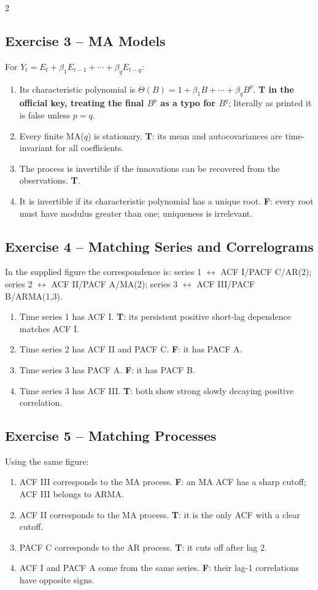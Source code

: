 \documentclass[9pt,a4paper]{extarticle}
\begin{document}
\begin{multicols}{2}
\subsection*{Exercise 3 -- MA Models}
For \(Y_t=E_t+\beta_1E_{t-1}+\cdots+\beta_qE_{t-q}\):
\begin{enumerate}[label=\alph*),leftmargin=4mm]
\item Its characteristic polynomial is \(\Theta(B)=1+\beta_1B+\cdots+\beta_qB^p\). \textbf{T in the official key, treating the final \(B^p\) as a typo for \(B^q\)}; literally as printed it is false unless \(p=q\).
\item Every finite MA(\(q\)) is stationary. \textbf{T}: its mean and autocovariances are time-invariant for all coefficients.
\item The process is invertible if the innovations can be recovered from the observations. \textbf{T}.
\item It is invertible if its characteristic polynomial has a unique root. \textbf{F}: every root must have modulus greater than one; uniqueness is irrelevant.
\end{enumerate}

\subsection*{Exercise 4 -- Matching Series and Correlograms}
In the supplied figure the correspondence is: series 1 \(\leftrightarrow\) ACF I/PACF C/AR(2); series 2 \(\leftrightarrow\) ACF II/PACF A/MA(2); series 3 \(\leftrightarrow\) ACF III/PACF B/ARMA(1,3).
\begin{enumerate}[label=\alph*),leftmargin=4mm]
\item Time series 1 has ACF I. \textbf{T}: its persistent positive short-lag dependence matches ACF I.
\item Time series 2 has ACF II and PACF C. \textbf{F}: it has PACF A.
\item Time series 3 has PACF A. \textbf{F}: it has PACF B.
\item Time series 3 has ACF III. \textbf{T}: both show strong slowly decaying positive correlation.
\end{enumerate}

\subsection*{Exercise 5 -- Matching Processes}
Using the same figure:
\begin{enumerate}[label=\alph*),leftmargin=4mm]
\item ACF III corresponds to the MA process. \textbf{F}: an MA ACF has a sharp cutoff; ACF III belongs to ARMA.
\item ACF II corresponds to the MA process. \textbf{T}: it is the only ACF with a clear cutoff.
\item PACF C corresponds to the AR process. \textbf{T}: it cuts off after lag 2.
\item ACF I and PACF A come from the same series. \textbf{F}: their lag-1 correlations have opposite signs.
\end{enumerate}


\end{multicols}
\end{document}
